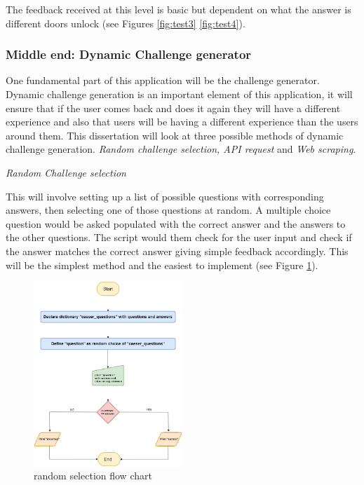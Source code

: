 \documentclass[12pt,a4paper]{article}
\begin{document}
The feedback received at this level is basic but dependent on what the answer is different doors unlock (see Figures \ref{fig:test3} \ref{fig:test4}).



\subsubsection{Middle end: Dynamic Challenge generator}  
One fundamental part of this application will be the challenge generator. Dynamic challenge generation is an important element of this application, it will ensure that if the user comes back and does it again they will have a different experience and also that users will be having a different experience than the users around them. This dissertation will look at three possible methods of dynamic challenge generation. \emph{Random challenge selection, API request} and \emph{Web scraping}.  

\emph{Random Challenge selection} 

This will involve setting up a list of possible questions with corresponding answers, then selecting one of those questions at random. A multiple choice question would be asked populated with the correct answer and the answers to the other questions. The script would them check for the user input and check if the answer matches the correct answer giving simple feedback accordingly. This will be the simplest method and the easiest to implement (see Figure \ref{RandomSelection}).  

\begin{figure}[h]
    \centering
    \includegraphics[width=0.5\textwidth]{Figs/random_selection (1).png}
    \caption{random selection flow chart} 
    \label{RandomSelection}
\end{figure}   
\end{document}
